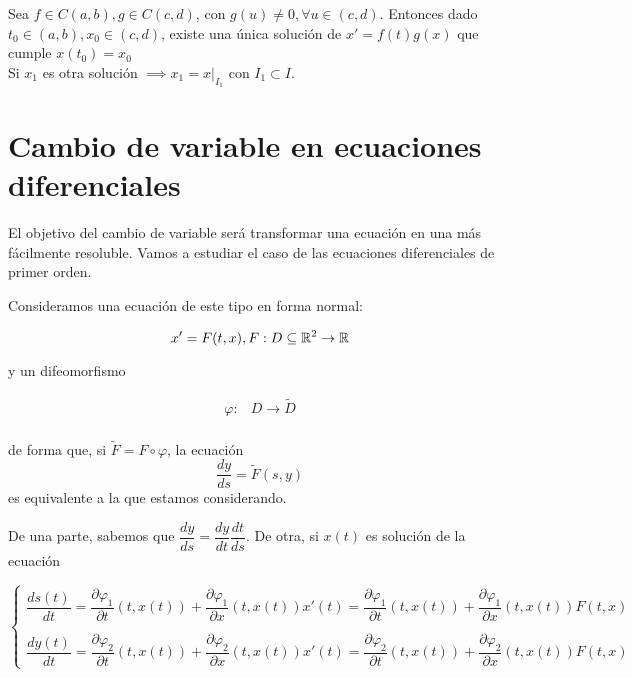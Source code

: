 \begin{nth}
Sea $f\in C(a,b), g\in C(c,d)$, con $g(u) \neq 0, \forall u \in (c,d)$. Entonces dado $t_0 \in (a,b), x_0 \in (c,d)$, existe una única solución de $x' = f(t)g(x)$ que cumple $x(t_0) = x_0$\\
Si $x_1$ es otra solución $\implies x_1 = x|_{I_1}$ con $I_1\subset I$.

\end{nth}

  
\section{Cambio de variable en ecuaciones diferenciales}
El objetivo del cambio de variable será transformar una ecuación en una más fácilmente resoluble.
Vamos a estudiar el caso de las ecuaciones diferenciales de primer orden.


Consideramos una ecuación de este tipo en forma normal:

\[
  x' = F(t, x), F : D \subseteq \mathbb{R}^2 \to \mathbb{R}
  \]

  y un difeomorfismo

  \[
  \begin{array}{lll}
    \varphi : & D \to \tilde{D} \\ 
  \end{array}
  \]

  de forma que, si $\tilde{F} = F \circ \varphi$, la ecuación
  \[ \dfrac{dy}{ds} = \tilde{F}(s, y) \]
  es equivalente a la que estamos considerando.

  De una parte, sabemos que $\dfrac{dy}{ds} = \dfrac{dy}{dt}\dfrac{dt}{ds}$. De otra, si $x(t)$
  es solución de la ecuación

  
  \[
  \begin{cases}
    \dfrac{ds(t)}{dt} = \dfrac{\partial \varphi_1}{\partial t}(t, x(t)) + \dfrac{\partial \varphi_1}{\partial x}(t, x(t))x'(t) = \dfrac{\partial \varphi_1}{\partial t}(t, x(t)) + \dfrac{\partial \varphi_1}{\partial x}(t, x(t))F(t, x) \\ \\

 \dfrac{dy(t)}{dt} = \dfrac{\partial \varphi_2}{\partial t}(t, x(t)) + \dfrac{\partial \varphi_2}{\partial x}(t, x(t))x'(t) = \dfrac{\partial \varphi_2}{\partial t}(t, x(t)) + \dfrac{\partial \varphi_2}{\partial x}(t, x(t))F(t, x)
   
  \end{cases}
  \]

